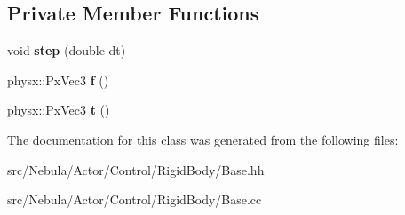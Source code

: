 \subsection*{\-Private \-Member \-Functions}
\begin{DoxyCompactItemize}
\item 
\hypertarget{classNeb_1_1Actor_1_1Control_1_1RigidBody_1_1Manual_a3c2b4eae153b06d68867bc49df7ab31f}{void {\bfseries step} (double dt)}\label{classNeb_1_1Actor_1_1Control_1_1RigidBody_1_1Manual_a3c2b4eae153b06d68867bc49df7ab31f}

\item 
\hypertarget{classNeb_1_1Actor_1_1Control_1_1RigidBody_1_1Manual_a33d7b5c2ba7f5f6092536a82777233a7}{physx\-::\-Px\-Vec3 {\bfseries f} ()}\label{classNeb_1_1Actor_1_1Control_1_1RigidBody_1_1Manual_a33d7b5c2ba7f5f6092536a82777233a7}

\item 
\hypertarget{classNeb_1_1Actor_1_1Control_1_1RigidBody_1_1Manual_a3283028b7fe36c55ddd0d9b214672b1e}{physx\-::\-Px\-Vec3 {\bfseries t} ()}\label{classNeb_1_1Actor_1_1Control_1_1RigidBody_1_1Manual_a3283028b7fe36c55ddd0d9b214672b1e}

\end{DoxyCompactItemize}


\-The documentation for this class was generated from the following files\-:\begin{DoxyCompactItemize}
\item 
src/\-Nebula/\-Actor/\-Control/\-Rigid\-Body/\-Base.\-hh\item 
src/\-Nebula/\-Actor/\-Control/\-Rigid\-Body/\-Base.\-cc\end{DoxyCompactItemize}
